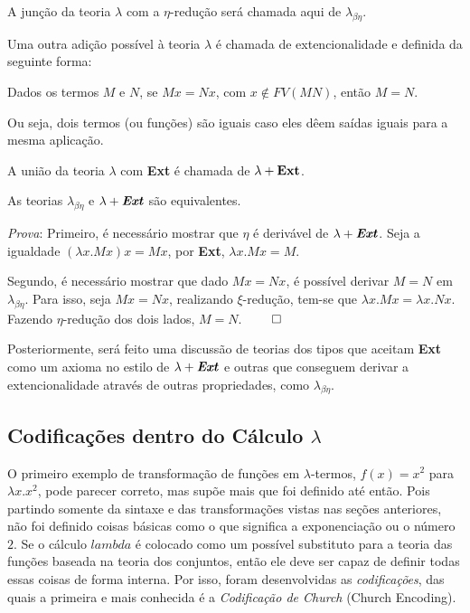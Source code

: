 \documentclass[../main.tex]{subfiles}
\begin{document}
A junção da teoria $\lambda$ com a $\eta$-redução será chamada aqui de $\lambda_{\beta \eta}$.

Uma outra adição possível à teoria $\lambda$ é chamada de extencionalidade e definida da seguinte forma:

\begin{definition}
    Dados os termos $M$ e $N$, se $M x = N x$, com $x \not\in FV(MN)$, então $M = N$.
\end{definition}


Ou seja, dois termos (ou funções) são iguais caso eles dêem saídas iguais para a mesma aplicação.

A união da teoria $\lambda$ com \textbf{Ext} é chamada de $\lambda + \text{\textbf{Ext}}$. 


\begin{theorem}
    As teorias $\lambda_{\beta \eta}$ e $\lambda + \text{\textbf{\emph{Ext}}}$ são equivalentes.
\end{theorem}

\emph{Prova}: Primeiro, é necessário mostrar que $\eta$ é derivável de $\lambda + \text{\textbf{\emph{Ext}}}$. Seja a igualdade $(\lambda x . Mx)x = Mx$, por \textbf{Ext}, $\lambda x . Mx = M$. 

Segundo, é necessário mostrar que dado $Mx = Nx$, é possível derivar $M = N$ em $\lambda_{\beta \eta}$. Para isso, seja $Mx = Nx$, realizando $\xi$-redução, tem-se que $\lambda x . Mx = \lambda x . Nx$. Fazendo $\eta$-redução dos dois lados, $M = N$. $\qed$

Posteriormente, será feito uma discussão de teorias dos tipos que aceitam \textbf{Ext} como um axioma no estilo de $\lambda + \text{\textbf{\emph{Ext}}}$ e outras que conseguem derivar a extencionalidade através de outras propriedades, como $\lambda_{\beta \eta}$. 


\subsection{Codificações dentro do Cálculo \texorpdfstring{$\lambda$}.}

O primeiro exemplo de transformação de funções em $\lambda$-termos, $f(x) = x^2$ para $\lambda x . x^2$, pode parecer correto, mas supõe mais que foi definido até então. Pois partindo somente da sintaxe e das transformações vistas nas seções anteriores, não foi definido coisas básicas como o que significa a exponenciação ou o número $2$. Se o cálculo $lambda$ é colocado como um possível substituto para a teoria das funções baseada na teoria dos conjuntos, então ele deve ser capaz de definir todas essas coisas de forma interna. Por isso, foram desenvolvidas as \emph{codificações}, das quais a primeira e mais conhecida é a \emph{Codificação de Church} (Church Encoding).
\end{document}
